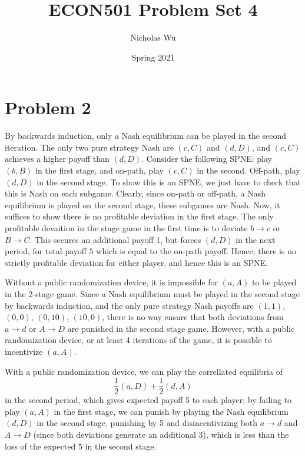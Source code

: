\documentclass[10pt,letter]{article}
\begin{document}


\title{ECON501 Problem Set 4}

\author{Nicholas Wu}

\date{Spring 2021}

\maketitle

\section*{Problem 2}
By backwards induction, only a Nash equilibrium can be played in the second iteration. The only two pure strategy Nash are $(c, C)$ and $(d, D)$, and $(c,C)$ achieves a higher payoff than $(d, D)$. Consider the following SPNE: play $(b,B)$ in the first stage, and on-path, play $(c,C)$ in the second. Off-path, play $(d,D)$ in the second stage. To show this is an SPNE, we just have to check that this is Nash on each subgame. Clearly, since on-path or off-path, a Nash equilibrium is played on the second stage, these subgames are Nash. Now, it suffices to show there is no profitable deviation in the first stage. The only profitable devaition in the stage game in the first time is to deviate $b \to c$ or $B \to C$. This secures an additional payoff 1, but forces $(d,D)$ in the next period, for total payoff $5$ which is equal to the on-path payoff. Hence, there is no strictly profitable deviation for either player, and hence this is an SPNE.

Without a public randomization device, it is impossible for $(a,A)$ to be played in the 2-stage game. Since a Nash equilibrium must be played in the second stage by backwards induction, and the only pure strategy Nash payoffs are $(1,1)$, $(0,0)$, $(0,10)$, $(10,0)$, there is no way ensure that both deviations from $a \to d$ or $A \to D$ are punished in the second stage game. However, with a public randomization device, or at least 4 iterations of the game, it is possible to incentivize $(a,A)$.

With a public randomization device, we can play the correllated equilibria of
\[ \frac{1}{2}(a,D) + \frac{1}{2}(d,A) \]
in the second period, which gives expected payoff 5 to each player; by failing to play $(a,A)$ in the first stage, we can punish by playing the Nash equilibrium $(d,D)$ in the second stage, punishing by 5 and disincentivizing both $a \to d$ and $A \to D$ (since both deviations generate an additional 3), which is less than the loss of the expected 5 in the second stage.
\end{document}
